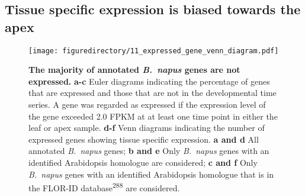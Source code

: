 \documentclass[12pt,]{book}
\begin{document}
\subsection{Tissue specific expression is biased towards the
apex}\label{section:spring:tissuespecfic}

\begin{figure}[htbp]
\centering
\texttt{[image: figuredirectory/11\_expressed\_gene\_venn\_diagram.pdf]}
\caption{\textbf{The majority of annotated \emph{B.~napus} genes are not
expressed.} \textbf{a-c} Euler diagrams indicating the percentage of
genes that are expressed and those that are not in the developmental
time series. A gene was regarded as expressed if the expression level of
the gene exceeded 2.0 FPKM at at least one time point in either the leaf
or apex sample. \textbf{d-f} Venn diagrams indicating the number of
expressed genes showing tissue specific expression. \textbf{a and d} All
annotated \emph{B.~napus} genes; \textbf{b and e} Only \emph{B.~napus}
genes with an identified Arabidopsis homologue are considered; \textbf{c
and f} Only \emph{B.~napus} genes with an identified Arabidopsis
homologue that is in the FLOR-ID database\textsuperscript{288} are
considered.}\label{figure:211:venn}
\end{figure}
\end{document}
